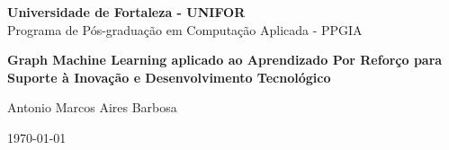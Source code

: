 \documentclass{article}
\begin{document}
\begin{titlepage}
    \centering
    \vspace*{1cm} %
    {\large \textbf{Universidade de Fortaleza - UNIFOR}\\ Programa de Pós-graduação em Computação Aplicada - PPGIA}
      
    \vspace*{4cm} %
    
    \begin{spacing}{1.5}
    \Large \textbf{Graph Machine Learning aplicado ao Aprendizado Por Reforço para Suporte à Inovação e Desenvolvimento Tecnológico}
    \end{spacing}
    
    \vspace*{4cm} %
    
    {\large Antonio Marcos Aires Barbosa} %

    \vfill %
    
    {\large \today} %
\end{titlepage}

\thispagestyle{empty} %

\clearpage
{} %

\tableofcontents

\clearpage
{} %

\begin{spacing}{1.5}











\end{spacing}
\end{document}

